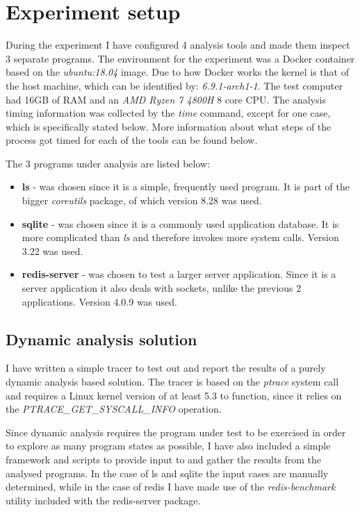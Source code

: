 \section{Experiment setup}
During the experiment I have configured 4 analysis tools and made them inspect 3 separate programs.
The environment for the experiment was a Docker container based on the \textit{ubuntu:18.04} image.
Due to how Docker works the kernel is that of the host machine, which can be identified by: \textit{6.9.1-arch1-1}.
The test computer had 16GB of RAM and an \textit{AMD Ryzen 7 4800H} 8 core CPU.
The analysis timing information was collected by the \textit{time} command, except for one case, which is specifically stated below. More information about what steps of the process got timed for each of the tools can be found below.

The 3 programs under analysis are listed below:
\begin{itemize}
    \item {\textbf{ls} - was chosen since it is a simple, frequently used program. It is part of the bigger \textit{coreutils} package, of which version 8.28 was used.}
    \item {\textbf{sqlite} - was chosen since it is a commonly used application database. It is more complicated than \textit{ls} and therefore invokes more system calls. Version 3.22 was used.}
    \item {\textbf{redis-server} - was chosen to test a larger server application. Since it is a server application it also deals with sockets, unlike the previous 2 applications. Version 4.0.9 was used.}
\end{itemize}

\subsection {Dynamic analysis solution}
I have written a simple tracer to test out and report the results of a purely dynamic analysis based solution.
The tracer is based on the \textit{ptrace} system call and requires a Linux kernel version of at least 5.3 to function, since it relies on the \textit{PTRACE\_GET\_SYSCALL\_INFO} operation.

Since dynamic analysis requires the program under test to be exercised in order to explore as many program states as possible, I have also included a simple framework and scripts to provide input to and gather the results from the analysed programs. In the case of ls and sqlite the input cases are manually determined, while in the case of redis I have made use of the \textit{redis-benchmark} utility included with the redis-server package.

